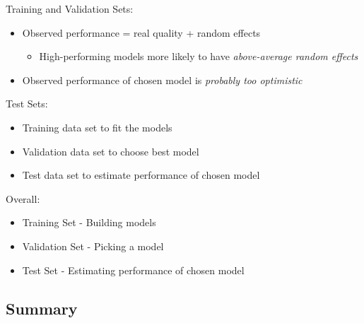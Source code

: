 \documentclass[
]{book}
\providecommand{\tightlist}{%
  \setlength{\itemsep}{0pt}\setlength{\parskip}{0pt}}
\begin{document}
Training and Validation Sets:

\begin{itemize}
\tightlist
\item
  Observed performance = real quality + random effects

  \begin{itemize}
  \tightlist
  \item
    High-performing models more likely to have \emph{above-average random effects}
  \end{itemize}
\item
  Observed performance of chosen model is \emph{probably too optimistic}
\end{itemize}

Test Sets:

\begin{itemize}
\tightlist
\item
  Training data set to fit the models
\item
  Validation data set to choose best model
\item
  Test data set to estimate performance of chosen model
\end{itemize}

Overall:

\begin{itemize}
\tightlist
\item
  Training Set - Building models
\item
  Validation Set - Picking a model
\item
  Test Set - Estimating performance of chosen model
\end{itemize}

\subsection{Summary}\label{summary}
\end{document}
